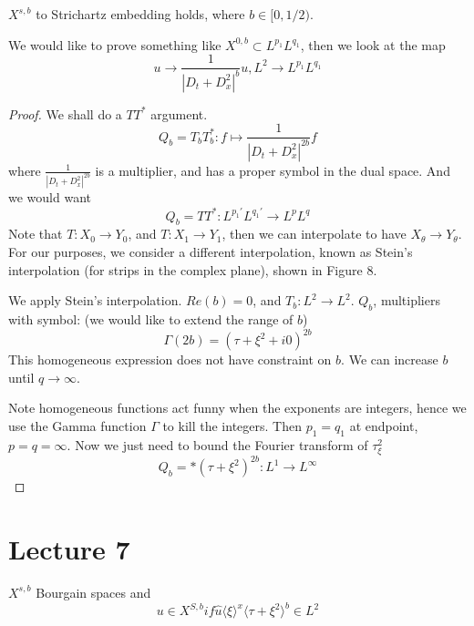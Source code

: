 \begin{theorem}
    $X^{s,b}$ to Strichartz embedding holds, where $b\in [0,1/2)$.
\end{theorem}
We would like to prove something like $X^{0,b}\subset L^{p_1}L^{q_1}$, then we look at the map
\begin{equation*}
    u\to\frac{1}{|D_t+D_x^2|^b}u, L^2\to L^{p_1}L^{q_1}
\end{equation*}
\begin{proof}
    We shall do a $TT^*$ argument.
    \begin{equation*}
        Q_b=T_bT_b^*: f\mapsto\frac{1}{|D_t+D_x^2|^{2b}}f
    \end{equation*}
    where $\frac{1}{|D_t+D_x^2|^{2b}}$ is a multiplier, and has a proper symbol in the dual space. And we would want
    \begin{equation*}
        Q_b=TT^*: L^{p_1'}L^{q_1'}\to L^pL^q
    \end{equation*}
    Note that $T: X_0\to Y_0$, and $T: X_1\to Y_1$, then we can interpolate to have $X_\theta\to Y_\theta$. For our purposes, we consider a different interpolation, known as Stein's interpolation (for strips in the complex plane), shown in Figure 8.

    We apply Stein's interpolation. $Re(b)=0$, and $T_b: L^2\to L^2$. $Q_b$, multipliers with symbol: (we would like to extend the range of $b$)
    \begin{equation*}
        \Gamma(2b)=(\tau+\xi^2+i0)^{2b}
    \end{equation*}
    This homogeneous expression does not have constraint on $b$. We can increase $b$ until $q\to\infty$.

    Note homogeneous functions act funny when the exponents are integers, hence we use the Gamma function $\Gamma$ to kill the integers. Then $p_1=q_1$ at endpoint, $p=q=\infty$. Now we just need to bound the Fourier transform of $\tau_\xi^2$
    \begin{equation*}
        Q_b=\ast (\tau+\xi^2)^{2b}: L^1\to L^\infty
    \end{equation*}

\end{proof}



\section{Lecture 7}
$X^{s,b}$ Bourgain spaces and
\begin{equation*}
    u\in X^{S,b} if \widehat{u}\langle\xi\rangle^x \langle \tau+\xi^2\rangle^b\in L^2
\end{equation*}

